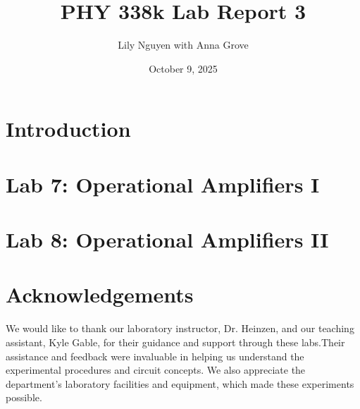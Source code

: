 \documentclass{article}
\title{PHY 338k Lab Report 3}
\author{Lily Nguyen with Anna Grove}
\date{October 9, 2025}
\begin{document}
\maketitle

\section{Introduction}


\section{Lab 7: Operational Amplifiers I}



\section{Lab 8: Operational Amplifiers II}



\section*{Acknowledgements}

We would like to thank our laboratory instructor, Dr. Heinzen, and our teaching 
assistant, Kyle Gable, for their guidance and support through these labs.Their 
assistance and feedback were invaluable in helping us understand the experimental 
procedures and circuit concepts. We also appreciate the department's laboratory 
facilities and equipment, which made these experiments possible.
\end{document}
